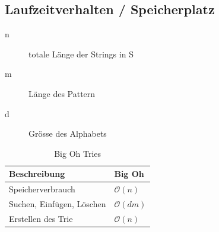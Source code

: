 \subsection{Laufzeitverhalten / Speicherplatz}
\begin{description}
	\item[n] totale Länge der Strings in S
	\item[m] Länge des Pattern
	\item[d] Grösse des Alphabets
\end{description}
\begin{table}[h]
	\centering
	\begin{tabu} to \linewidth {l l}
		\toprule
		Beschreibung & Big Oh \\
		\midrule
		Speicherverbrauch & $\mathcal{O}(n)$ \\
		Suchen, Einfügen, Löschen & $\mathcal{O}(dm)$ \\
		Erstellen des Trie & $\mathcal{O}(n)$ \\		\bottomrule
	\end{tabu}
	\caption{Big Oh Tries}
\end{table}

